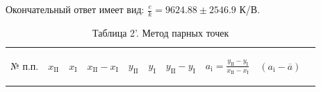 Окончательный ответ имеет вид: $\frac{e}{k} = 9624.88 \pm2546.9$ К/В.

\begin{center}
\begin{table}[H]
\centering
\caption*{Таблица 2'. Метод парных точек}
\label{tabl:4}
\begin{tabular}{|c|c|c|c|c|c|c|c|c|c|}
\hline
\begin{minipage}{3mm}
    № п.п. 
\end{minipage}&
\begin{minipage}{5mm}
   \begin{center} $x_{\text{II}}$ \end{center} 
\end{minipage} &
\begin{minipage}{5mm}
   \begin{center} $x_{\text{I}}$ \end{center} 
\end{minipage} &
\begin{minipage}{14mm}
   \begin{center} $x_{\text{II}}-x_{\text{I}}$ \end{center} 
\end{minipage}&
\begin{minipage}{5mm}
   \begin{center} $y_{\text{II}}$ \end{center} 
\end{minipage}&
\begin{minipage}{5mm}
   \begin{center} $y_{\text{I}}$ \end{center} 
\end{minipage}&
\begin{minipage}{14mm}
   \begin{center} $y_{\text{II}}-y_{\text{I}}$ \end{center} 
\end{minipage}&
\begin{minipage}{22mm}
   \begin{center} $a_{\text{i}}=\frac{y_{\text{II}}-y_{\text{I}}}{x_{\text{II}}-x_{\text{I}}}$ \end{center} 
\end{minipage}&
\begin{minipage}{15mm}
     \begin{center} $(a_{\text{i}}-\overline{a})$ \end{center}
\end{minipage}&
\begin{minipage}{20mm}

\end{minipage}
\end{tabular}
\end{table}
\end{center}
